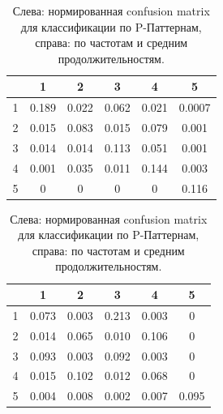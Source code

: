 \documentclass[12pt]{report}
\begin{document}
\begin{table}
\noindent
\label{tab:conft}
\begin{multicols}{2}
\noindent
\vfill
\hfill
\begin{tabular}{|c|c|c|c|c|c| }
\hline
~&1 & 2 & 3 & 4 & 5 \\
\hline
1 & 0.189 &   0.022 &   0.062  &  0.021  &  0.0007\\ \hline
2 & 0.015 &   0.083 &   0.015  &  0.079  &  0.001\\ \hline
3 & 0.014 &   0.014 &   0.113  &  0.051  &  0.001\\ \hline
4 & 0.001 &   0.035 &   0.011  &  0.144  &  0.003\\ \hline
5 & 0      &   0      &   0       &  0       &  0.116\\ \hline
\end{tabular}
\vfill
\hfill
\begin{tabular}{|c|c|c|c|c|c| }
\hline
~&1 & 2 & 3 & 4 & 5 \\
\hline
1 & 0.073  &  0.003 &   0.213 &   0.003 &        0\\ \hline
2 & 0.014  &  0.065 &   0.010 &   0.106 &        0\\ \hline
3 & 0.093  &  0.003 &   0.092 &   0.003 &        0\\ \hline
4 & 0.015  &  0.102 &   0.012 &   0.068 &        0\\ \hline
5 & 0.004  &  0.008 &   0.002 &   0.007 &   0.095\\ \hline
\end{tabular}
\end{multicols}
\caption{Слева: нормированная confusion matrix для классификации по P-Паттернам, справа: по частотам и средним продолжительностям.}
\end{table}
\end{document}
